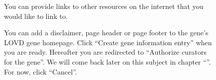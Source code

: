 \begin{figure}[ht]
  \begin{shaded}
		\caption{You can provide links to other resources on the internet that you would like to link to.}
		\label{fig:create_gene_ABHD12_III}
  \end{shaded}
\end{figure}

\begin{figure}[ht]
  \begin{shaded}
		\caption{You can add a disclaimer, page header or page footer to the gene's LOVD gene homepage.
		Click ``Create gene information entry'' when you are ready. \newline
		Hereafter you are redirected to ``Authorize curators for the gene''.
		We will come back later on this subject in chapter ``''.
		For now, click ``Cancel''.}
		\label{fig:create_gene_ABHD12_IV}
  \end{shaded}
\end{figure}










